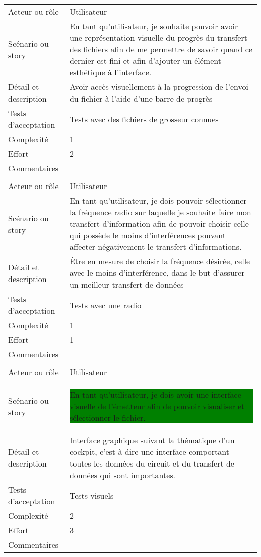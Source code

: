 \begin{longtable}{|l|p{}|}
\hline
    \rowcolor{Gray}
    \multicolumn{2}{|l|}{9} \\
\hline
    Acteur ou rôle & Utilisateur \\
\hline
    Scénario ou story &  En tant qu'utilisateur,
          je souhaite pouvoir avoir une représentation visuelle
          du progrès du transfert des fichiers afin de me permettre
          de savoir quand ce dernier est fini et afin d'ajouter un
          élément esthétique à l'interface. \\
\hline
    Détail et description & Avoir accès visuellement à la progression de l'envoi du fichier à l'aide d'une barre de progrès \\
\hline
    Tests d'acceptation & Tests avec des fichiers de grosseur connues\\
\hline
    Complexité & 1 \\
\hline
    Effort & 2 \\
\hline
    Commentaires &  \\

\hline
    \rowcolor{Gray}
    \multicolumn{2}{|l|}{10} \\
\hline
    Acteur ou rôle & Utilisateur \\
\hline
    Scénario ou story &  En tant qu'utilisateur,
          je dois pouvoir sélectionner la fréquence radio sur laquelle je
          souhaite faire mon transfert d'information afin de pouvoir choisir celle 
          qui possède le moins d'interférences pouvant affecter négativement le transfert d'informations. \\
\hline
    Détail et description & Être en mesure de choisir la fréquence désirée, celle avec le moins d'interférence, dans le but d'assurer un meilleur transfert de données \\
\hline
    Tests d'acceptation & Tests avec une radio\\
\hline
    Complexité & 1 \\
\hline
    Effort & 1 \\
\hline
    Commentaires &  \\

\hline
    \rowcolor{Gray}
    \multicolumn{2}{|l|}{11} \\
\hline
    Acteur ou rôle & Utilisateur \\
\hline
    Scénario ou story & \colorbox{Green}{\parbox{14.5cm}{En tant qu'utilisateur,
          je dois avoir une interface visuelle de l'émetteur afin
          de pouvoir visualiser et sélectionner le fichier.}}\\
\hline
    Détail et description & Interface graphique suivant la thématique d'un cockpit, c'est-à-dire une interface comportant toutes les données du circuit et du transfert de données qui sont importantes. \\
\hline
    Tests d'acceptation & Tests visuels\\
\hline
    Complexité & 2 \\
\hline
    Effort & 3\\
\hline
    Commentaires &  \\


\end{longtable}
